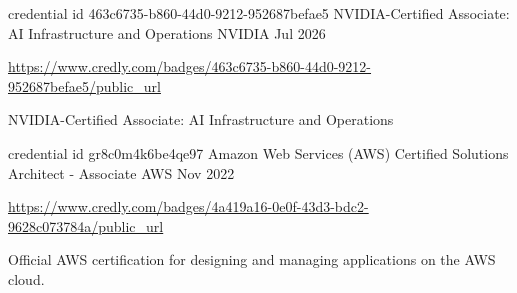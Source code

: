 
\begin{cventries}

\cventry
{credential id 463c6735-b860-44d0-9212-952687befae5}
{NVIDIA-Certified Associate: AI Infrastructure and Operations}
{NVIDIA}
{Jul 2026}
{
	\begin{cvitems}
  		\item {\url{https://www.credly.com/badges/463c6735-b860-44d0-9212-952687befae5/public_url}}
		\item {NVIDIA-Certified Associate: AI Infrastructure and Operations}
	\end{cvitems}
}

\cventry
{credential id gr8c0m4k6be4qe97}
{Amazon Web Services (AWS) Certified Solutions Architect - Associate}
{AWS}
{Nov 2022}
{
	\begin{cvitems}
  		\item {\url{https://www.credly.com/badges/4a419a16-0e0f-43d3-bdc2-9628c073784a/public_url}}
		\item {Official AWS certification for designing and managing applications on the AWS cloud.}
	\end{cvitems}
}

\end{cventries}
